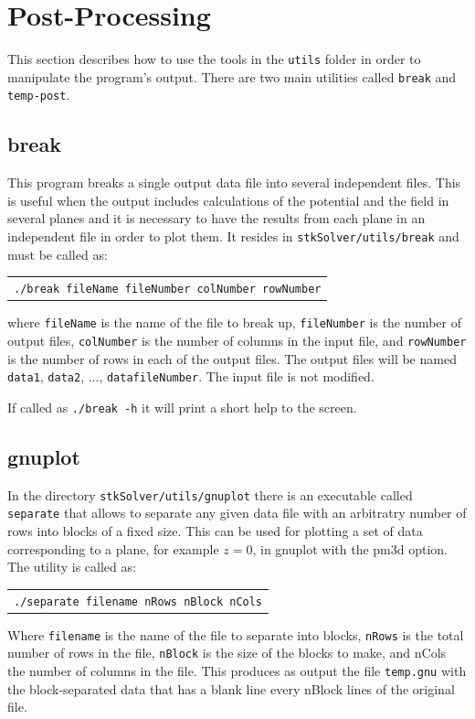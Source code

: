 \documentclass[12pt]{article}
\begin{document}
\pagebreak

\section{Post-Processing}
This section describes how to use the tools in the \verb+utils+ folder in order to manipulate the program's output. There are two main utilities called \verb+break+ and \verb+temp-post+.

\subsection{break}
This program breaks a single output data file into several independent files. This is useful when the output includes calculations of the potential and the field in several planes and it is necessary to have the results from each plane in an independent file in order to plot them. It resides in \verb+stkSolver/utils/break+ and must be called as:

\begin{tabular}{l}
\texttt{./break fileName fileNumber colNumber rowNumber}
\end{tabular}

where \verb+fileName+ is the name of the file to break up, \verb+fileNumber+ is the number of output files, \verb+colNumber+ is the number of columns in the input file, and \verb+rowNumber+ is the number of rows in each of the output files. The output files will be named \verb+data1+, \verb+data2+, ..., \verb+datafileNumber+. The input file is not modified.

If called as \verb+./break -h+ it will print a short help to the screen.

\subsection{gnuplot}
In the directory \verb+stkSolver/utils/gnuplot+ there is an executable called \verb+separate+ that allows to separate any given data file with an arbitratry number of rows into blocks of a fixed size. This can be used for plotting a set of data corresponding to a plane, for example $z=0$, in gnuplot with the pm3d option. The utility is called as:

\begin{tabular}{l}
\texttt{./separate filename nRows nBlock nCols}
\end{tabular}

Where \verb+filename+ is the name of the file to separate into blocks, \verb+nRows+ is the total number of rows in the file, \verb+nBlock+ is the size of the blocks to make, and nCols the number of columns in the file. This produces as output the file \verb+temp.gnu+ with the block-separated data that has a blank line every nBlock lines of the original file.
\end{document}
